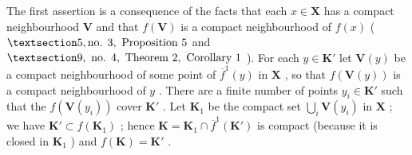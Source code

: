 The first assertion is a consequence of the facts that each \(x \in \mathbf{X}\) has a compact neighbourhood \(\mathbf{V}\) and that \(f(\mathbf{V})\) is a compact neighbourhood of \(f(x)\) ( \(\S 5, \text{no. } 3, \text{ Proposition } 5\) and \(\S 9, \text{ no. } 4, \text{ Theorem } 2, \text{ Corollary } 1\) ). For each \(y \in \mathbf{K}'\) let \(\mathbf{V}(y)\) be a compact neighbourhood of some point of \(\overline{f}^1(y)\) in \(\mathbf{X}\) , so that \(f(\mathbf{V}(y))\) is a compact neighbourhood of \(y\) . There are a finite number of points \(y_i \in \mathbf{K}'\) such that the \(f(\mathbf{V}(y_i))\) cover \(\mathbf{K}'\) . Let \(\mathbf{K}_1\) be the compact set \(\bigcup_i \mathbf{V}(y_i)\) in \(\mathbf{X}\) ; we have \(\mathbf{K}' \subset f(\mathbf{K}_1)\) ; hence \(\mathbf{K} = \mathbf{K}_1 \cap \overline{f}^1(\mathbf{K}')\) is compact (because it is closed in \(\mathbf{K}_1\) ) and \(f(\mathbf{K}) = \mathbf{K}'\) .


